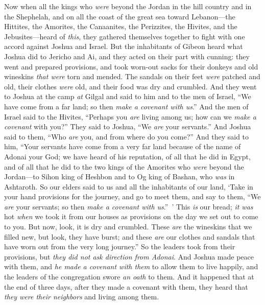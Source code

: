 \begin{biblechapter} %
 Now when all the kings who \textit{were} beyond the Jordan in the hill country and in the Shephelah, and on all the coast of the great sea toward Lebanon—the Hittites, the Amorites, the Canaanites, the Perizzites, the Hivites, and the Jebusites—heard of \textit{this},
\verse they gathered themselves together to fight with one accord against Joshua and Israel.
\verse But the inhabitants of Gibeon heard what Joshua did to Jericho and Ai,
\verse and they acted on their part with cunning: they went and prepared provisions, and took worn-out sacks for their donkeys and old wineskins \textit{that were} torn and mended.
\verse The sandals on their feet \textit{were} patched and old, their clothes \textit{were} old, and their food was dry and crumbled.
\verse And they went to Joshua at the camp \textit{at} Gilgal and said to him and to the men of Israel, “We have come from a far land; so then \textit{make a covenant with us}.”
\verse And the men of Israel said to the Hivites, “Perhaps you \textit{are} living among us; how can we \textit{make a covenant} with you?”
\verse They said to Joshua, “We \textit{are} your servants.” And Joshua said to them, “Who \textit{are} you, and from where do you come?”
\verse And they said to him, “Your servants have come from a very far land because of the name of Adonai your God; we have heard of his reputation, of all that he did in Egypt,
\verse and of all that he did to the two kings of the Amorites who \textit{were} beyond the Jordan—to Sihon king of Heshbon and to Og king of Bashan, who \textit{was} in Ashtaroth.
\verse So our elders said to us and all the inhabitants of our land, ‘Take in your hand provisions for the journey, and go to meet them, and say to them, “We \textit{are} your servants; so then \textit{make a covenant with us}.” ’
\verse This \textit{is} our bread; \textit{it was} hot \textit{when} we took it from our houses as provisions on the day we set out to come to you. But now, look, it is dry and crumbled.
\verse These \textit{are} the wineskins that we filled new, but look, they have burst; and these \textit{are} our clothes and sandals that have worn out from the very long journey.”
\verse So the leaders took from their provisions, but \textit{they did not ask direction from Adonai}.
\verse And Joshua made peace with them, and \textit{he made a covenant with them} to allow them to live happily, and the leaders of the congregation swore \textit{an oath} to them.
\verse And it happened that at the end of three days, after they made a covenant with them, they heard that \textit{they were their neighbors} and living among them.

\end{biblechapter}
